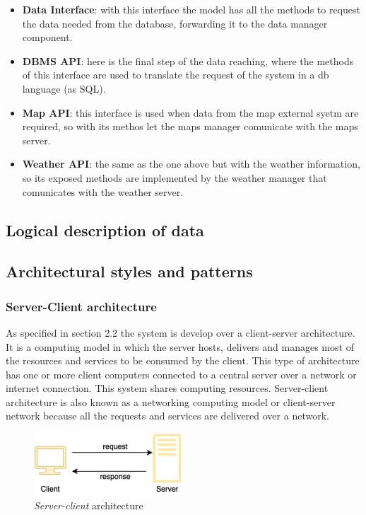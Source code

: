 \begin{itemize}
    \item \textbf{Data Interface}: with this interface the model has all the methods to request the data needed from the database, forwarding it to the data manager component. 
    \item \textbf{DBMS API}: here is the final step of the data reaching, where the methods of this interface are used to translate the request of the system in a db language (as SQL).
    \item \textbf{Map API}: this interface is used when data from the map external syetm are required, so with its methos let the maps manager comunicate with the maps server.
    \item \textbf{Weather API}: the same as the one above but with the weather information, so its exposed methods are implemented by the weather manager that comunicates with the weather server.
\end{itemize}
\subsection{Logical description of data}



\subsection{Architectural styles and patterns}

\subsubsection{Server-Client architecture}
As specified in section 2.2 the system is develop over a client-server architecture. It is a computing model in which the server hosts, delivers and manages most of the resources and services to be consumed by the client. This type of architecture has one or more client computers connected to a central server over a network or internet connection. This system shares computing resources. Server-client architecture is also known as a networking computing model or client-server network because all the requests and services are delivered over a network.
\begin{figure}[H]
    \begin{center}
    \includegraphics[width=0.5\textwidth]{images/client-server.png}
    \caption{\emph{Server-client} architecture}
    \label{fig:client-server}
    \end{center}
\end{figure}

